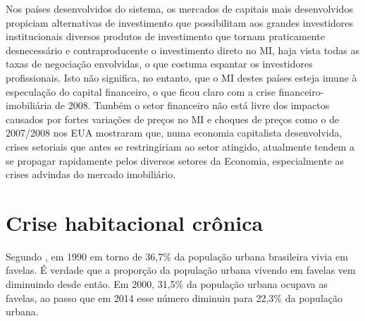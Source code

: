 \documentclass[
	12pt,				%
	oneside,			%
	a4paper,			%
	chapter=TITLE,		%
	section=TITLE,		%
	english,			%
	brazil				%
	]{abntex2}
\begin{document}
Nos países desenvolvidos do sistema, os mercados de capitais mais desenvolvidos
propiciam alternativas de investimento que possibilitam aos grandes investidores
institucionais diversos produtos de investimento que tornam praticamente
desnecessário e contraproducente o investimento direto no \gls{MI}, haja vista
todas as taxas de negociação envolvidas, o que costuma espantar os investidores
profissionais. Isto não significa, no entanto, que o \gls{MI} destes países
esteja imune à especulação do capital financeiro, o que ficou claro com a crise
financeiro-imobiliária de 2008. Também o setor financeiro não está livre dos
impactos causados por fortes variações de preços no \gls{MI} e choques de preços
como o de 2007/2008 nos EUA mostraram que, numa economia capitalista
desenvolvida, crises setoriais que antes se restringiriam ao setor atingido,
atualmente tendem a se propagar rapidamente pelos diversos setores da Economia,
especialmente as crises advindas do mercado imobiliário.

\hypertarget{crise-habitacional-cruxf4nica}{%
\section{Crise habitacional crônica}\label{crise-habitacional-cruxf4nica}}

Segundo \textcite{ritchie_urbanization_2018}, em 1990 em torno de 36,7\% da população
urbana brasileira vivia em favelas. É verdade que a proporção da população
urbana vivendo em favelas vem diminuindo desde então. Em 2000, 31,5\% da
população urbana ocupava as favelas, ao passo que em 2014 esse número diminuiu
para 22,3\% da população urbana.
\end{document}

